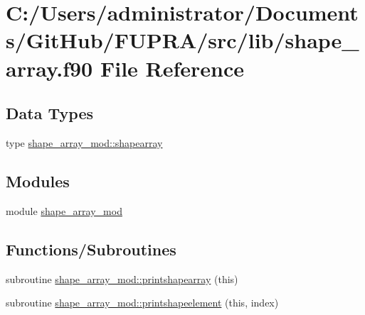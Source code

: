 \hypertarget{shape__array_8f90}{}\section{C\+:/\+Users/administrator/\+Documents/\+Git\+Hub/\+F\+U\+P\+R\+A/src/lib/shape\+\_\+array.f90 File Reference}
\label{shape__array_8f90}
\subsection*{Data Types}
\begin{DoxyCompactItemize}
\item 
type \hyperlink{structshape__array__mod_1_1shapearray}{shape\+\_\+array\+\_\+mod\+::shapearray}
\end{DoxyCompactItemize}
\subsection*{Modules}
\begin{DoxyCompactItemize}
\item 
module \hyperlink{namespaceshape__array__mod}{shape\+\_\+array\+\_\+mod}
\end{DoxyCompactItemize}
\subsection*{Functions/\+Subroutines}
\begin{DoxyCompactItemize}
\item 
subroutine \hyperlink{namespaceshape__array__mod_a7b3e08e575b74d321d61ffaea85c2895}{shape\+\_\+array\+\_\+mod\+::printshapearray} (this)
\item 
subroutine \hyperlink{namespaceshape__array__mod_a21045b79e1718e47bd933ce6181ee7fd}{shape\+\_\+array\+\_\+mod\+::printshapeelement} (this, index)
\end{DoxyCompactItemize}
